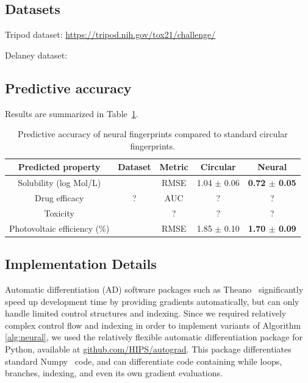 \documentclass{article}
\begin{document}
\subsection{Datasets}

Tripod dataset: \url{https://tripod.nih.gov/tox21/challenge/}
\cite{unterthiner2015toxicity}

Delaney dataset:
\cite{delaney_data_2004}


\subsection{Predictive accuracy}

Results are summarized in Table~\ref{table:main results}.


\begin{table}
\begin{tabular}{ccc|cc}
Predicted property           & Dataset                     & Metric & Circular        & Neural   \\
\hline
Solubility (log Mol/L)       & \citet{delaney_data_2004}   &   RMSE & 1.04 $\pm$ 0.06 & \bf{0.72} $\pm$ 0.05 \\
Drug efficacy                & ?                           &   AUC  & ?               &      ?               \\
Toxicity                     & \citet{tox21}               &    ?   & ?               &      ?               \\
Photovoltaic efficiency (\%) & \citet{hachmann2011harvard} &  RMSE  & 1.85 $\pm$ 0.10 & \bf{1.70} $\pm$ 0.09
\end{tabular}
\label{table:main results}
\caption{Predictive accuracy of neural fingerprints compared to standard circular fingerprints.}
\end{table}


\subsection{Implementation Details}
Automatic differentiation (AD) software packages such as
Theano~\citep{Bastien-Theano-2012, bergstra2010scipy} significantly speed up development time by providing gradients automatically, but can only handle limited control structures and indexing.
Since we required relatively complex control flow and indexing in order to implement variants of Algorithm \ref{alg:neural}, we used the relatively flexible automatic differentiation package for Python, available at \url{github.com/HIPS/autograd}.
This package differentiates standard Numpy~\citep{oliphant2007python} code, and can differentiate code containing while loops, branches, indexing, and even its own gradient evaluations.
\end{document}
